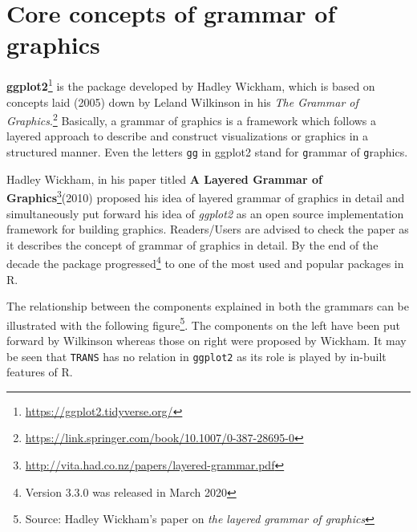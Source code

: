 \documentclass[
]{book}
\begin{document}
\hypertarget{core-concepts-of-grammar-of-graphics}{%
\section{\texorpdfstring{Core concepts of \textbf{grammar of graphics}}{Core concepts of grammar of graphics}}\label{core-concepts-of-grammar-of-graphics}}

\textbf{ggplot2}\footnote{\url{https://ggplot2.tidyverse.org/}} \citep{R-ggplot2} is the package developed by Hadley Wickham, which is based on concepts laid (2005) down by Leland Wilkinson in his \emph{The Grammar of Graphics}.\footnote{\url{https://link.springer.com/book/10.1007/0-387-28695-0}} Basically, a grammar of graphics is a framework which follows a layered approach to describe and construct visualizations or graphics in a structured manner. Even the letters \texttt{gg} in ggplot2 stand for \texttt{g}rammar of \texttt{g}raphics.

Hadley Wickham, in his paper titled \textbf{A Layered Grammar of Graphics}\footnote{\url{http://vita.had.co.nz/papers/layered-grammar.pdf}}(2010) \citep{layered-grammar} proposed his idea of layered grammar of graphics in detail and simultaneously put forward his idea of \emph{ggplot2} as an open source implementation framework for building graphics. Readers/Users are advised to check the paper as it describes the concept of grammar of graphics in detail. By the end of the decade the package progressed\footnote{Version 3.3.0 was released in March 2020} to one of the most used and popular packages in R.

The relationship between the components explained in both the grammars can be illustrated with the following figure\footnote{Source: Hadley Wickham's paper on \emph{the layered grammar of graphics}}. The components on the left have been put forward by Wilkinson whereas those on right were proposed by Wickham. It may be seen that \texttt{TRANS} has no relation in \texttt{ggplot2} as its role is played by in-built features of R.
\end{document}
